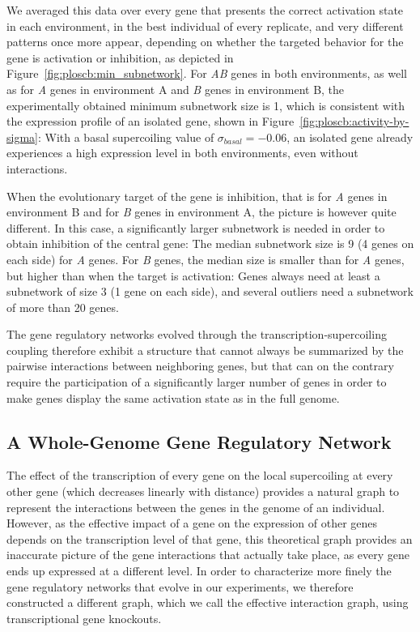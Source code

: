 We averaged this data over every gene that presents the correct activation state in each environment, in the best individual of every replicate, and very different patterns once more appear, depending on whether the targeted behavior for the gene is activation or inhibition, as depicted in Figure~\ref{fig:ploscb:min_subnetwork}.
For \emph{AB} genes in both environments, as well as for \emph{A} genes in environment A and \emph{B} genes in environment B, the experimentally obtained minimum subnetwork size is 1, which is consistent with the expression profile of an isolated gene, shown in Figure~\ref{fig:ploscb:activity-by-sigma}: With a basal supercoiling value of $\sigma_{basal} = -0.06$, an isolated gene already experiences a high expression level in both environments, even without interactions.

When the evolutionary target of the gene is inhibition, that is for \emph{A} genes in environment B and for \emph{B} genes in environment A, the picture is however quite different.
In this case, a significantly larger subnetwork is needed in order to obtain inhibition of the central gene: The median subnetwork size is 9 (4 genes on each side) for \emph{A} genes.
For \emph{B} genes, the median size is smaller than for \emph{A} genes, but higher than when the target is activation: Genes always need at least a subnetwork of size 3 (1 gene on each side), and several outliers need a subnetwork of more than 20 genes.

The gene regulatory networks evolved through the transcription-supercoiling coupling therefore exhibit a structure that cannot always be summarized by the pairwise interactions between neighboring genes, but that can on the contrary require the participation of a significantly larger number of genes in order to make genes display the same activation state as in the full genome.


\subsection{A Whole-Genome Gene Regulatory Network}

The effect of the transcription of every gene on the local supercoiling at every other gene (which decreases linearly with distance) provides a natural graph to represent the interactions between the genes in the genome of an individual.
However, as the effective impact of a gene on the expression of other genes depends on the transcription level of that gene, this theoretical graph provides an inaccurate picture of the gene interactions that actually take place, as every gene ends up expressed at a different level.
In order to characterize more finely the gene regulatory networks that evolve in our experiments, we therefore constructed a different graph, which we call the effective interaction graph, using transcriptional gene knockouts.

